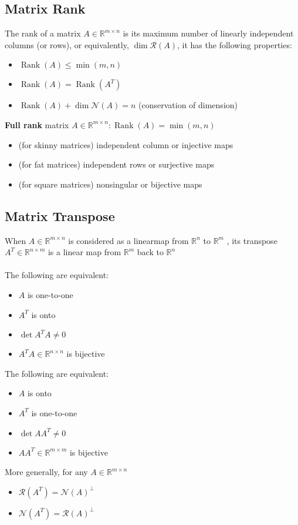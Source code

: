 \documentclass[10pt,a4paper,oneside]{article}
\begin{document}
\subsection{Matrix Rank}
The rank of a matrix $A \in \mathbb{R}^{m \times n}$ is its maximum number of linearly independent  columns (or rows), or equivalently, $\operatorname{dim} \mathcal{R}(A)$, it has the following properties:
\begin{itemize}
\item $\operatorname{Rank}(A) \leq \min (m, n)$
\item $\operatorname{Rank}(A)=\operatorname{Rank}\left(A^{T}\right)$
\item $\operatorname{Rank}(A)+\operatorname{dim} \mathcal{N}(A)=n$ (conservation of dimension)
\end{itemize}
{\bfseries Full rank} matrix $A \in \mathbb{R}^{m \times n}: \operatorname{Rank}(A)=\min (m, n)$
\begin{itemize}
\item (for skinny matrices) independent column or injective maps
\item (for fat matrices) independent rows or surjective maps
\item (for square matrices) nonsingular or bijective maps
\end{itemize}

\subsection{Matrix Transpose}
When $A \in \mathbb{R}^{m \times n}$ is considered as a linearmap from $\mathbb{R}^{n}$ to $\mathbb{R}^{m}$ , its
transpose $A^{T} \in \mathbb{R}^{n \times m}$ is a linear map from $\mathbb{R}^{m}$ back to $\mathbb{R}^{n}$\\
\\The following are equivalent:
\begin{itemize}
\item $A$ is one-to-one
\item $A^{T}$ is onto
\item $\operatorname{det} A^{T} A \neq 0$
\item $A^{T} A \in \mathbb{R}^{n \times n}$ is bijective
\end{itemize}
The following are equivalent:
\begin{itemize}
\item $A$ is onto
\item $A^{T}$ is one-to-one
\item $\operatorname{det} A A^{T} \neq 0$
\item $A A^{T} \in \mathbb{R}^{m \times m}$ is bijective
\end{itemize}
More generally, for any $A\in \mathbb{R}^{m\times n}$
\begin{itemize}
\item $\mathcal{R}\left(A^{T}\right)=\mathcal{N}(A)^{\perp}$
\item $\mathcal{N}\left(A^{T}\right)=\mathcal{R}(A)^{\perp}$
\end{itemize}
\end{document}
